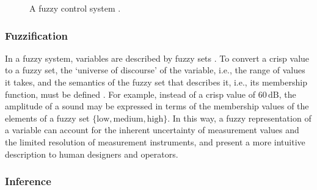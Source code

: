 \begin{figure}
  \centering
  \caption{A fuzzy control system \parencite[331-332]{Klir1995}.}
  \label{fig:fuzzy-control}
\end{figure}

\subsubsection{Fuzzification}
\label{q1:fuzzification}

In a fuzzy system, variables are described by fuzzy sets \parencite[327]{Klir1995}.
To convert a crisp value to a fuzzy set, the `universe of discourse' of the variable,
i.e., the range of values it takes, and the semantics of the fuzzy set that describes
it, i.e., its membership function, must be defined \parencite[60]{Sugeno1985}.
For example, instead of a crisp value of $60\,\text{dB}$, the amplitude of a sound may
be expressed in terms of the membership values of the elements of a fuzzy set
$\{\text{low}, \text{medium}, \text{high}\}$.
In this way, a fuzzy representation of a variable can account for the inherent
uncertainty of measurement values and the limited resolution of measurement
instruments, and present a more intuitive description to human designers and operators.

\subsubsection{Inference}
\label{q1:inference}

